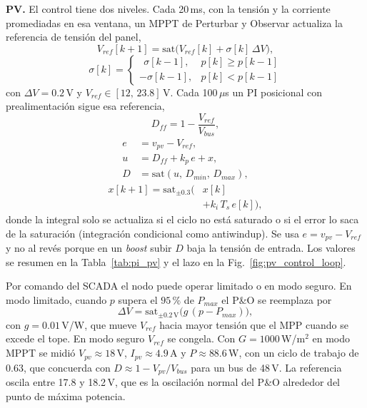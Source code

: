 \documentclass[conference]{IEEEtran}
\begin{document}
\textbf{PV.} El control tiene dos niveles. Cada 20\,ms, con la tensión y la corriente promediadas en esa ventana, un MPPT de Perturbar y Observar actualiza la referencia de tensión del panel,
\begin{equation}
\label{eq:pv_po}
V_{ref}[k+1]=\mathrm{sat}\big(V_{ref}[k]+\sigma[k]\,\Delta V\big),
\end{equation}
\begin{equation}
\label{eq:pv_sigma}
\sigma[k]=\begin{cases}
\ \ \sigma[k-1], & p[k]\ge p[k-1]\\
-\sigma[k-1], & p[k]<p[k-1]
\end{cases}
\end{equation}
con $\Delta V=0.2$\,V y $V_{ref}\in[12,\,23.8]$\,V. Cada 100\,$\mu$s un PI posicional con prealimentación sigue esa referencia,
\begin{equation}
\label{eq:pv_ff}
D_{ff}=1-\frac{V_{ref}}{V_{bus}},
\end{equation}
\begin{equation}
\label{eq:pv_pi}
\begin{aligned}
e&=v_{pv}-V_{ref},\\
u&=D_{ff}+k_p\,e+x,\\
D&=\mathrm{sat}(u,\,D_{min},\,D_{max}),
\end{aligned}
\end{equation}
\begin{equation}
\label{eq:pv_int}
\begin{aligned}
x[k+1]=\mathrm{sat}_{\pm0.3}\big(&x[k]\\
&+k_i\,T_s\,e[k]\big),
\end{aligned}
\end{equation}
donde la integral solo se actualiza si el ciclo no está saturado o si el error lo saca de la saturación (integración condicional como antiwindup). Se usa $e=v_{pv}-V_{ref}$ y no al revés porque en un \emph{boost} subir $D$ baja la tensión de entrada. Los valores se resumen en la Tabla~\ref{tab:pi_pv} y el lazo en la Fig.~\ref{fig:pv_control_loop}.

Por comando del SCADA el nodo puede operar limitado o en modo seguro. En modo limitado, cuando $p$ supera el $95\,\%$ de $P_{max}$ el P\&O se reemplaza por
\begin{equation}
\label{eq:pv_lim}
\Delta V=\mathrm{sat}_{\pm0.2\,\mathrm{V}}\big(g\,(p-P_{max})\big),
\end{equation}
con $g=0.01$\,V/W, que mueve $V_{ref}$ hacia mayor tensión que el MPP cuando se excede el tope. En modo seguro $V_{ref}$ se congela. Con $G=1000$\,W/m$^2$ en modo MPPT se midió $V_{pv}\approx18$\,V, $I_{pv}\approx4.9$\,A y $P\approx88.6$\,W, con un ciclo de trabajo de $0.63$, que concuerda con $D\approx1-V_{pv}/V_{bus}$ para un bus de 48\,V. La referencia oscila entre 17.8 y 18.2\,V, que es la oscilación normal del P\&O alrededor del punto de máxima potencia.
\end{document}
